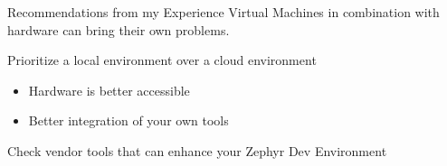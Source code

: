 \documentclass[10pt, aspectratio=169]{beamer}
\begin{document}
\begin{frame}[fragile]{Recommendations from my Experience}
Virtual Machines in combination with hardware can bring their own problems.

Prioritize a local environment over a cloud environment
  \begin{itemize}
    \item Hardware is better accessible
    \item Better integration of your own tools
  \end{itemize}

        Check vendor tools that can enhance your Zephyr Dev Environment
\end{frame}
\end{document}
